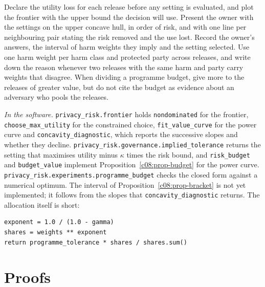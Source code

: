 \begin{inpractice}\sloppy
Declare the utility loss for each release before any setting is evaluated, and plot
the frontier with the upper bound the decision will use. Present the owner with the
settings on the upper concave hull, in order of risk, and with one line per
neighbouring pair stating the risk removed and the use lost. Record the owner's
answers, the interval of harm weights they imply and the setting selected. Use one
harm weight per harm class and protected party across releases, and write down the
reason whenever two releases with the same harm and party carry weights that
disagree. When dividing a programme budget, give more to the releases of greater
value, but do not cite the budget as evidence about an adversary who pools the
releases.

\smallskip\noindent\textit{In the software.} \texttt{privacy\_risk.frontier} holds
\texttt{nondominated} for the frontier, \texttt{choose\_max\_utility} for the
constrained choice, \texttt{fit\_value\_curve} for the power curve and
\texttt{concavity\_diagnostic}, which reports the successive slopes and whether they
decline. \texttt{privacy\_risk.governance.implied\_tolerance} returns the setting
that maximises utility minus $\kappa$ times the risk bound, and
\texttt{risk\_budget} and \texttt{budget\_value} implement
Proposition~\ref{c08:prop-budget} for the power curve.
\texttt{privacy\_risk.experiments.programme\_budget} checks the closed form against
a numerical optimum. The interval of Proposition~\ref{c08:prop-bracket} is not yet
implemented; it follows from the slopes that \texttt{concavity\_diagnostic}
returns. The allocation itself is short:
\begin{lstlisting}
exponent = 1.0 / (1.0 - gamma)
shares = weights ** exponent
return programme_tolerance * shares / shares.sum()
\end{lstlisting}
\end{inpractice}

\section{Proofs}\label{c08:sec-proofs}

